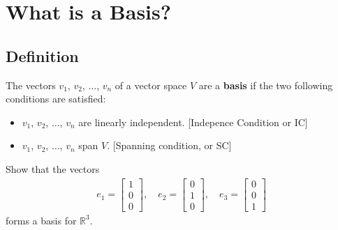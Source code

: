 \documentclass[12pt,a4paper]{article}
\newcounter{example}[section]
\begin{document}
	\newpage
	
\section{What is a Basis?}

	\subsection{Definition}
	
	The vectors $v_1$, $v_2$, $\ldots$, $v_n$ of a vector space $V$ are a \textbf{basis} if the two following conditions are satisfied:
		\begin{itemize}
		\item $v_1$, $v_2$, $\ldots$, $v_n$ are linearly independent. [Indepence Condition or IC]
		\item $v_1$, $v_2$, $\ldots$, $v_n$ span $V$. [Spanning condition, or SC]
		\end{itemize}
		
	\begin{example}
	Show that the vectors
		\begin{align*}
		e_1 = \begin{bmatrix}
		1 \\ 0 \\ 0
		\end{bmatrix} , \quad
		e_2 = \begin{bmatrix}
		0 \\ 1 \\ 0
		\end{bmatrix} , \quad
		e_3 = \begin{bmatrix}
		0 \\ 0 \\ 1
		\end{bmatrix}
		\end{align*}
	forms a basis for $\mathbb{R}^3$.
	\end{example}
	
	\vfill
	
\end{document}
